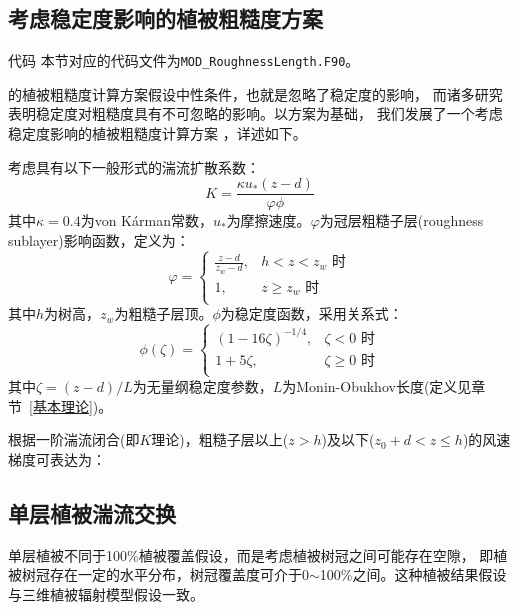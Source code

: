\subsection{考虑稳定度影响的植被粗糙度方案}
\begin{mymdframed}{代码}
本节对应的代码文件为\texttt{MOD\_RoughnessLength.F90}。
\end{mymdframed}

\citet{raupach1992drag,raupach1994simplified}的植被粗糙度计算方案假设中性条件，也就是忽略了稳定度的影响，
而诸多研究表明稳定度对粗糙度具有不可忽略的影响。以\citet{raupach1992drag,raupach1994simplified}方案为基础，
我们发展了一个考虑稳定度影响的植被粗糙度计算方案 \citep{liu2023roughnesslength}，详述如下。

考虑具有以下一般形式的湍流扩散系数：
\begin{equation}\label{eddydiffusivity}
K=\frac{\kappa u_{*} (z-d)} {\varphi \phi }
\end{equation}
其中$\kappa=0.4$为von K\'arman常数，$u_{*}$为摩擦速度。$\varphi$为冠层粗糙子层(roughness sublayer)影响函数，定义为：
\begin{equation}
\varphi = \begin{cases}
   \frac{z-d} {z_{w}-d}, & h<z<z_{w} \text { 时} \\
   1, & z \geq z_{w} \text { 时} \\
\end{cases}
\end{equation}
其中$h$为树高，$z_{w}$为粗糙子层顶。$\phi$为稳定度函数，采用\citet{dyer1974review}关系式：
\begin{equation}
\phi(\zeta) = \begin{cases}
   (1-16\zeta)^{-1/4}, & \zeta<0 \text { 时} \\
   1+5\zeta, & \zeta \geq 0 \text { 时} \\
\end{cases}
\end{equation}
其中$\zeta = (z-d)/L$为无量纲稳定度参数，$L$为Monin-Obukhov长度(定义见章节~\ref{基本理论})。

根据一阶湍流闭合(即$K$理论)，粗糙子层以上($z>h$)及以下($z_0 + d<z \leq h$)的风速梯度可表达为：



\subsection{单层植被湍流交换}
单层植被不同于100\%植被覆盖假设，而是考虑植被树冠之间可能存在空隙，
即植被树冠存在一定的水平分布，树冠覆盖度可介于0$\sim$100\%之间。这种植被结果假设与三维植被辐射模型假设一致。


